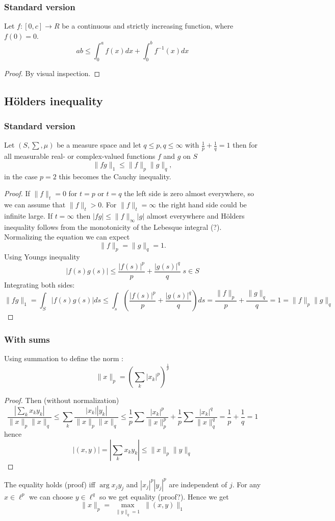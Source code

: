 \documentclass[titlepage]{article}
\begin{document}
\subsubsection{Standard version}
Let $f:[0,c]\longrightarrow R$ be a continuous and strictly increasing function, where $f(0) = 0$.
$$ab\leq\int_0^a f(x)dx + \int_0^b f^{-1}(x)dx $$

\begin{proof}
By visual inspection.
\end{proof}
\subsection{Hölders inequality}
\subsubsection{Standard version}
Let $(S,\sum, \mu)$ be a measure space and let $q \leq p, q \leq \infty$ with $\frac{1}{p}+ \frac{1}{q} = 1$ then for all measurable real- or complex-valued functions $f$ and $g$ on $S$
$$\|fg\|_1 \leq \|f\|_p \|g\|_q,$$
in the case $p = 2$ this becomes the Cauchy inequality.
\begin{proof}
If $\|f\|_{t} = 0$ for $t = p$ or $t = q$ the left side is zero almost everywhere, so we can assume that $\|f\|_t > 0$. For $\|f\|_{t}= \infty$ the right hand side could be infinite large. 
If $t = \infty$ then $|fg|\leq\|f\|_\infty|g|$ almost everywhere and Hölders inequality follows from the monotonicity of the Lebesque integral (?). Normalizing the equation we can expect
$$\|f\|_p = \|g\|_q = 1.$$
Using Youngs inequality
$$|f(s) g(s)| \leq \frac{|f(s)|^p}{p} + \frac{|g(s)| ^q}{q} \; s\in S$$
Integrating both sides:
$$\|fg\|_1 = \int_S |f(s)g(s)| ds \leq \int_s \left(\frac{|f(s)|^p}{p} + \frac{|g(s)| ^q}{q} \right) ds = \frac{\|f\|_p}{p} + \frac{\|g\|_q}{q} = 1 = \|f\|_p \|g\|_q $$
\end{proof}
\subsubsection{With sums}
Using summation to define the norm :
$$\|x\|_p = \left(\sum_k|x_k|^p\right)^{\frac{1}{p}}$$
\begin{proof}


Then (without normalization)
$$\frac{|\sum_kx_ky_k|}{\|x\|_p\|x\|_q} \leq  \sum_k\frac{|x_k||y_k|}{\|x\|_p\|x\|_q} \leq  \frac{1}{p}\sum \frac{|x_k|^p}{\|x\|_p^p}+ \frac{1}{p}\sum \frac{|x_k|^q}{\|x\|_q^q} = \frac{1}{p} + \frac{1}{q} = 1$$
hence
$$|(x,y)|= |\sum_kx_ky_k| \leq {\|x\|_p\|y\|_q}$$
\end{proof}
The equality holds (proof) iff $\arg x_jy_j$  and $|x_j|^p|y_j|^p$ are independent of $j$. For any $x\in \ell^p$ we can choose $y\in \ell^q$ so we get equality (proof?). Hence we get 
$$ \|x\|_p = \max\limits_{\substack{\|y\|_q = 1}}\|(x,y)\|_1$$
\end{document}
